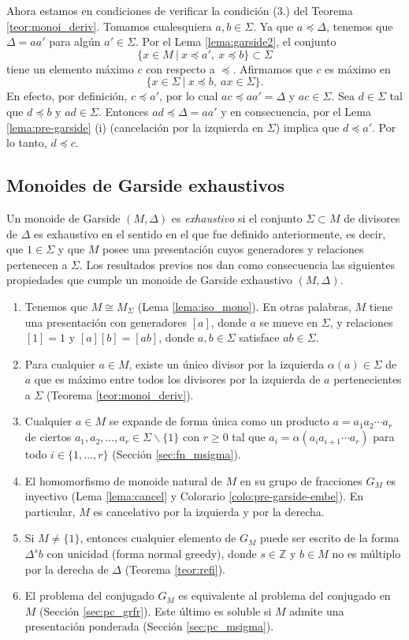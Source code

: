 \documentclass[12pt]{book}
\theoremstyle{definition}
\begin{document}
Ahora estamos en condiciones de verificar la condición (3.) del Teorema \ref{teor:monoi_deriv}. Tomamos cualesquiera $a,b\in\Sigma$. Ya que $a\preceq\Delta$, tenemos que $\Delta=aa'$ para algún $a'\in\Sigma$. Por el Lema \ref{lema:garside2}, el conjunto
$$\{x\in M\ |\ x\preceq a',\ x\preceq b\}\subset\Sigma$$ tiene un elemento máximo $c$ con respecto a $\preceq$. Afirmamos que $c$ es máximo en 
$$\{x\in\Sigma\ |\ x\preceq b,\ ax\in\Sigma\}.$$
En efecto, por definición, $c\preceq a'$, por lo cual $ac\preceq aa'=\Delta$ y $ac\in\Sigma$. Sea $d\in\Sigma$ tal que $d\preceq b$ y $ad\in\Sigma$. Entonces $ad\preceq\Delta=aa'$ y en consecuencia, por el Lema \ref{lema:pre-garside} (i) (cancelación por la izquierda en $\Sigma$) implica que $d\preceq a'$. Por lo tanto, $d\preceq c$.

\subsection{Monoides de Garside exhaustivos}

Un monoide de Garside $(M,\Delta)$ es \textit{exhaustivo} si el conjunto $\Sigma\subset M$ de divisores de $\Delta$ es exhaustivo en el sentido en el que fue definido anteriormente, es decir, que $1\in\Sigma$ y que $M$ posee una presentación cuyos generadores y relaciones pertenecen a $\Sigma$. Los resultados previos nos dan como consecuencia las siguientes propiedades que cumple un monoide de Garside exhaustivo $(M,\Delta)$.

\begin{enumerate}[label=(\arabic*)]
\item Tenemos que $M\cong M_\Sigma$ (Lema \ref{lema:iso_mono}). En otras palabras, $M$ tiene una presentación con generadores $[a]$, donde $a$ se mueve en $\Sigma$, y relaciones $[1]=1$ y $[a][b]=[ab]$, donde $a,b\in\Sigma$ satisface $ab\in\Sigma$.
\item Para cualquier $a\in M$, existe un único divisor por la izquierda $\alpha(a)\in\Sigma$ de $a$ que es máximo entre todos los divisores por la izquierda de $a$ pertenecientes a $\Sigma$ (Teorema \ref{teor:monoi_deriv}).
\item Cualquier $a\in M$ se expande de forma única como un producto $a=a_1a_2\cdots a_r$ de ciertos $a_1,a_2,\ldots,a_r\in\Sigma \backslash\{1\}$ con $r\geq 0$ tal que $a_i=\alpha(a_ia_{i+1}\cdots a_r)$ para todo $i\in\{1,\ldots,r\}$ (Sección \ref{sec:fn_msigma}).
\item El homomorfismo de monoide natural de $M$ en su grupo de fracciones $G_M$ es inyectivo (Lema \ref{lema:cancel} y Colorario \ref{colo:pre-garside-embe}). En particular, $M$ es cancelativo por la izquierda y por la derecha.
\item Si $M\neq \{1\}$, entonces cualquier elemento de $G_M$ puede ser escrito de la forma $\Delta^s b$ con unicidad (forma normal greedy), donde $s\in\mathbb{Z}$ y $b\in M$ no es múltiplo por la derecha de $\Delta$ (Teorema \ref{teor:refi}).
\item El problema del conjugado $G_M$ es equivalente al problema del conjugado en $M$ (Sección \ref{sec:pc_grfr}). Este último es soluble si $M$ admite una presentación ponderada (Sección \ref{sec:pc_msigma}).
\end{enumerate}
\end{document}
